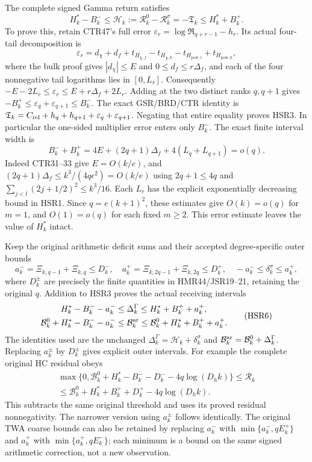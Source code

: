 The complete signed Gamma return satisfies
\[
 \boxed{\quad H_k^*-B_k^-\leq
 \mathcal H_k:=\mathcal R_k^0-\mathcal R_k^\sigma
             =-\mathfrak T_k
 \leq H_k^*+B_k^+.\quad}\tag{HSR3}
\]
To prove this, retain CTR47's full error
$\varepsilon_r=\log\mathfrak R_{q+r-1}-h_r$.
Its actual four-tail decomposition is
\[
 \varepsilon_r=d_\chi+d_f
   +t_{H_{\chi,f}}-t_{H_{\chi,0}}
   -t_{H_{\mathrm{pow},l}}+t_{H_{\mathrm{pow},0}},
\]
where the bulk proof gives $|d_\chi|\leq E$ and
$0\leq d_f\leq r\Delta_f$, and each of the four
nonnegative tail logarithms lies in $[0,L_r]$.
Consequently
$-E-2L_r\leq\varepsilon_r\leq E+r\Delta_f+2L_r$.
Adding at the two distinct ranks $q,q+1$ gives
$-B_k^+\leq\varepsilon_q+\varepsilon_{q+1}\leq B_k^-$.
The exact GSR/BRD/CTR identity is
$\mathfrak T_k=C_{\rm rel}+h_q+h_{q+1}
                 +\varepsilon_q+\varepsilon_{q+1}$.
Negating that entire equality proves HSR3. In particular
the one-sided multiplier error enters only $B_k^-$.
The exact finite interval width is
\[
 B_k^-+B_k^+=4E+(2q+1)\Delta_f+4(L_q+L_{q+1})=o(q).
 \tag{HSR4}
\]
Indeed CTR31--33 give $E=O(k/e)$, and
$(2q+1)\Delta_f\leq k^3/(4q\epsilon^2)=O(k/e)$ using
$2q+1\leq4q$ and $\sum_{j<l}(2j+1/2)^2\leq k^3/16$.
Each $L_r$ has the explicit exponentially decreasing bound
in HSR1. Since $q=e(k+1)^2$, these estimates give $O(k)=o(q)$
for $m=1$, and $O(1)=o(q)$ for each fixed $m\geq2$.
This error estimate leaves the value of $H_k^*$ intact.

Keep the original arithmetic deficit sums and their accepted
degree-specific outer bounds
\[
 a_k^-=\Xi_{k,q-1}+\Xi_{k,q}\leq D_k^-,\quad
 a_k^+=\Xi_{k,2q-1}+\Xi_{k,2q}\leq D_k^+,\quad
 -a_k^-\leq\delta_k^\sigma\leq a_k^+,
 \tag{HSR5}
\]
where $D_k^\pm$ are precisely the finite quantities in
HMR44/JSR19--21, retaining the original $q$. Addition to
HSR3 proves the actual receiving intervals
\[
\begin{aligned}
 H_k^*-B_k^--a_k^-&\leq\Delta_k^\Gamma
                     \leq H_k^*+B_k^++a_k^+,\\
 \mathcal B_k^0+H_k^*-B_k^--a_k^-&\leq\mathcal B_k^{\rm ar}
                     \leq\mathcal B_k^0+H_k^*+B_k^++a_k^+.
\end{aligned}\tag{HSR6}
\]
The identities used are the unchanged
$\Delta_k^\Gamma=\mathcal H_k+\delta_k^\sigma$ and
$\mathcal B_k^{\rm ar}=\mathcal B_k^0+\Delta_k^\Gamma$.
Replacing $a_k^\pm$ by $D_k^\pm$ gives explicit outer
intervals. For example the complete original HC residual obeys
\[
\begin{gathered}
 \max\{0,\mathcal B_k^0+H_k^*-B_k^--D_k^-
                              -4q\log(D_hk)\}
 \leq\mathcal R_k\\
 \leq\mathcal B_k^0+H_k^*+B_k^++D_k^+
                              -4q\log(D_hk).
\end{gathered}\tag{HSR7}
\]
This subtracts the same original threshold and uses its
proved residual nonnegativity. The narrower version using
$a_k^\pm$ follows identically. The original TWA coarse bounds
can also be retained by replacing $a_k^-$ with
$\min\{a_k^-,qE_k^+\}$ and $a_k^+$ with
$\min\{a_k^+,qE_k^-\}$; each minimum is a bound on the
same signed arithmetic correction, not a new observation.

